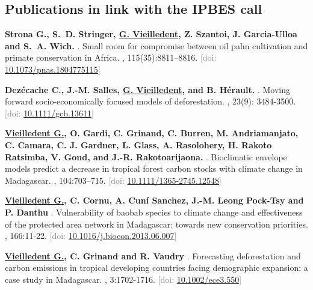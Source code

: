 \documentclass[10pt,a4paper,sans]{moderncv}
\newcounter{enumiv_gv}
\begin{document}
\vspace{0.3cm}
\subsection{Publications in link with the IPBES call}

\begin{thebibliography}{5}

\setcounter{enumiv}{9}
\textbf{Strona G., S.~D. Stringer, \underline{G. Vieilledent}, Z. Szantoi, J. Garcia-Ulloa and S.~A. Wich.}
.
\newblock Small room for compromise between oil palm cultivation and primate conservation in Africa.
, 115(35):8811--8816.
\newblock \textcolor{gray}{[doi: \href{https://doi.org/10.1073/pnas.1804775115}{10.1073/pnas.1804775115}]}

\setcounter{enumiv}{8}
\textbf{Dezécache C., J.-M. Salles, \underline{G. Vieilledent}, and B. Hérault.}
.
\newblock Moving forward socio-economically focused models of deforestation.
, 23(9): 3484-3500.
\newblock \textcolor{gray}{[doi: \href{https://doi.org/10.1111/gcb.13611}{10.1111/gcb.13611}]}

\setcounter{enumiv}{7}
\textbf{\underline{Vieilledent G.}, O. Gardi, C. Grinand, C. Burren, M. Andriamanjato, C. Camara, C. J. Gardner, L. Glass, A. Rasolohery, H. Rakoto Ratsimba, V. Gond, and J.-R. Rakotoarijaona.} 
.
\newblock Bioclimatic envelope models predict a decrease in tropical forest carbon stocks with climate change in Madagascar.
, 104:703--715.
\newblock \textcolor{gray}{[doi: \href{https://doi.org/10.1111/1365-2745.12548}{10.1111/1365-2745.12548}]}

\setcounter{enumiv}{6}
\textbf{\underline{Vieilledent G.}, C. Cornu, A. Cuní Sanchez, J.-M. Leong Pock-Tsy and P. Danthu} 
.
\newblock Vulnerability of baobab species to climate change and effectiveness of the protected area network in Madagascar: towards new conservation priorities.
, 166:11-22.
\newblock \textcolor{gray}{[doi: \href{https://doi.org/10.1016/j.biocon.2013.06.007}{10.1016/j.biocon.2013.06.007}]}

\setcounter{enumiv}{5}
\textbf{\underline{Vieilledent G.}, C. Grinand and R. Vaudry} 
.
\newblock Forecasting deforestation and carbon emissions in tropical developing countries facing demographic expansion: a case study in Madagascar.
, 3:1702-1716.
\newblock \textcolor{gray}{[doi: \href{https://doi.org/10.1002/ece3.550}{10.1002/ece3.550}]}

\end{thebibliography}
\end{document}
